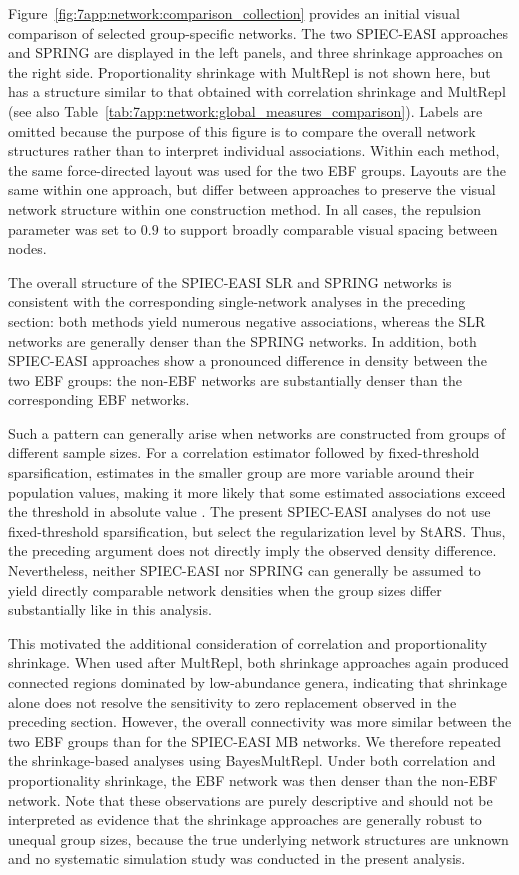 Figure~\ref{fig:7app:network:comparison_collection} provides an initial visual comparison of selected group-specific networks. The two SPIEC-EASI approaches and SPRING are displayed in the left panels, and three shrinkage approaches on the right side. Proportionality shrinkage with MultRepl is not shown here, but has a structure similar to that obtained with correlation shrinkage and MultRepl (see also Table~\ref{tab:7app:network:global_measures_comparison}). Labels are omitted because the purpose of this figure is to compare the overall network structures rather than to interpret individual associations. Within each method, the same force-directed layout was used for the two EBF groups. Layouts are the same within one approach, but differ between approaches to preserve the visual network structure within one construction method. In all cases, the repulsion parameter was set to $0.9$ to support broadly comparable visual spacing between nodes.

The overall structure of the SPIEC-EASI SLR and SPRING networks is consistent with the corresponding single-network analyses in the preceding section: both methods yield numerous negative associations, whereas the SLR networks are generally denser than the SPRING networks. In addition, both SPIEC-EASI approaches show a pronounced difference in density between the two EBF groups: the non-EBF networks are substantially denser than the corresponding EBF networks.

Such a pattern can generally arise when networks are constructed from groups of different sample sizes. For a correlation estimator followed by fixed-threshold sparsification, estimates in the smaller group are more variable around their population values, making it more likely that some estimated associations exceed the threshold in absolute value \citep{fisher1921probable}. The present SPIEC-EASI analyses do not use fixed-threshold sparsification, but select the regularization level by StARS. Thus, the preceding argument does not directly imply the observed density difference. Nevertheless, neither SPIEC-EASI nor SPRING can generally be assumed to yield directly comparable network densities when the group sizes differ substantially like in this analysis.

This motivated the additional consideration of correlation and proportionality shrinkage. When used after MultRepl, both shrinkage approaches again produced connected regions dominated by low-abundance genera, indicating that shrinkage alone does not resolve the sensitivity to zero replacement observed in the preceding section. However, the overall connectivity was more similar between the two EBF groups than for the SPIEC-EASI MB networks. We therefore repeated the shrinkage-based analyses using BayesMultRepl. Under both correlation and proportionality shrinkage, the EBF network was then denser than the non-EBF network. Note that these observations are purely descriptive and should not be interpreted as evidence that the shrinkage approaches are generally robust to unequal group sizes, because the true underlying network structures are unknown and no systematic simulation study was conducted in the present analysis.

